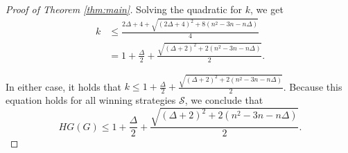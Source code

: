\documentclass{amsart}
\newcommand{\1}{\mathds{1}}
\numberwithin{theorem}{section}
\def\cS{\ensuremath{\mathcal{S}}}
\begin{document}
\begin{proof}[Proof of Theorem \ref{thm:main}]
    Solving the quadratic for $k$, we get
    \begin{align*}
         k &\leq \frac{2\Delta+4+\sqrt{(2\Delta  +4)^2 +8(n^2-3n-n\Delta)}}{4}
         \\ &= 1+\frac{\Delta}{2}+ \frac{\sqrt{(\Delta +2)^2 + 2(n^2-3n-n\Delta)}}{2}.
    \end{align*}
    
\medskip

    In either case, it holds that $k \leq 1+\frac{\Delta}{2}+ \frac{\sqrt{(\Delta +2)^2 + 2(n^2-3n-n\Delta)}}{2}$. Because this equation holds for all winning strategies $\cS$, we conclude that $$HG(G) \leq 1+\frac{\Delta}{2}+ \frac{\sqrt{(\Delta +2)^2 + 2(n^2-3n-n\Delta)}}{2}.$$
\end{proof}
\end{document}
